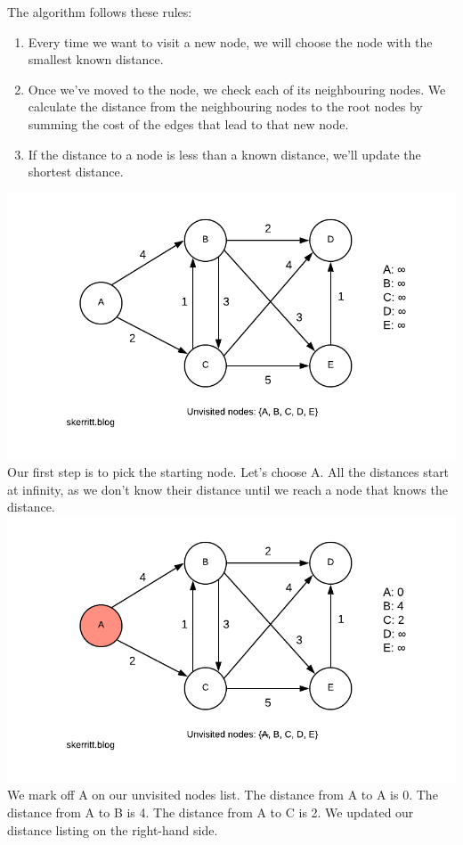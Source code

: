 \documentclass{article}
\begin{document}
The algorithm follows these rules:
\begin{enumerate}
    \item Every time we want to visit a new node, we will choose the node with the smallest known distance.
    \item Once we've moved to the node, we check each of its neighbouring nodes. We calculate the distance from the neighbouring nodes to the root nodes by summing the cost of the edges that lead to that new node.
    \item If the distance to a node is less than a known distance, we'll update the shortest distance.
\end{enumerate}
\includegraphics{Blank-Diagram-33-.png}
Our first step is to pick the starting node. Let's choose A. All the distances start at infinity, as we don't know their distance until we reach a node that knows the distance.
\includegraphics{Blank-Diagram-35-.png}
We mark off A on our unvisited nodes list. The distance from A to A is 0. The distance from A to B is 4. The distance from A to C is 2. We updated our distance listing on the right-hand side.
\end{document}
